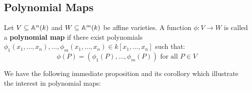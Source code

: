 \subsection*{Polynomial Maps}

\begin{definition}
  Let $V \subseteq \mathbb{A}^n(k)$ and $W \subseteq \mathbb{A}^m(k)$ be affine
  varieties. A function $\phi:V \xrightarrow{} W$ is called a
  \textbf{polynomial map} if there exist polynomials $\phi_1(x_1,
  \dots, x_n), \dots, \phi_m(x_1, \dots, x_n) \in k[x_1, \dots, x_n]$
  such that:
  \begin{equation}
    \phi(P)=(\phi_1(P), \dots, \phi_m(P)) \text{ for all } P \in V
  \end{equation}
\end{definition}

We have the following immediate proposition and its corollory which
illustrate the interest in polynomial maps:

